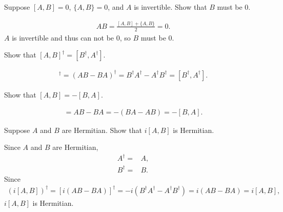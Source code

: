 \documentclass[en]{sol-man}
\begin{document}
\begin{exe}
    Suppose $[A,B]=0$, $\{A,B\}=0$, and $A$ is invertible. Show that $B$ must be 0.
\end{exe}
\begin{pf}
    \begin{align}
        AB=\frac{[A,B]+\{A,B\}}{2}=0.
    \end{align}
    $A$ is invertible and thus can not be $0$, so $B$ must be $0$.
\end{pf}

\begin{exe}
    Show that $[A,B]^{\dagger}=[B^{\dagger},A^{\dagger}]$.
\end{exe}
\begin{pf}
    \begin{align}
        [A,B]^{\dagger}=(AB-BA)^{\dagger}=B^{\dagger}A^{\dagger}-A^{\dagger}B^{\dagger}=[B^{\dagger},A^{\dagger}].
    \end{align}
\end{pf}

\begin{exe}
    Show that $[A,B]=-[B,A]$.
\end{exe}
\begin{pf}
    \begin{align}
        [A,B]=AB-BA=-(BA-AB)=-[B,A].
    \end{align}
\end{pf}

\begin{exe}
    Suppose $A$ and $B$ are Hermitian. Show that $i[A,B]$ is Hermitian.
\end{exe}
\begin{pf}
    Since $A$ and $B$ are Hermitian,
    \begin{align}
        A^{\dagger}=&A,\\
        B^{\dagger}=&B.
    \end{align}
    Since
    \begin{align}
        (i[A,B])^{\dagger}=[i(AB-BA)]^{\dagger}=-i(B^{\dagger}A^{\dagger}-A^{\dagger}B^{\dagger})=i(AB-BA)=i[A,B],
    \end{align}
    $i[A,B]$ is Hermitian.
\end{pf}
\end{document}
